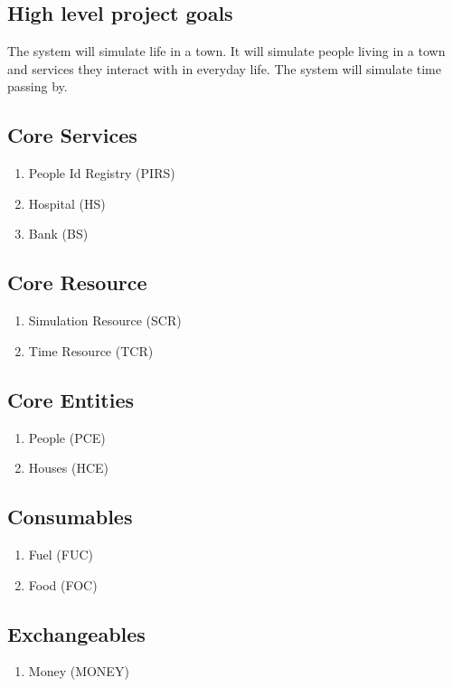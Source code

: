 \subsection{High level project goals} 
The system will simulate life in a town. It will simulate people living in a town and services they interact with in everyday life. 
The system will simulate time passing by.

\subsection{Core Services} 
\begin{enumerate}
\item People Id Registry (PIRS)
\item Hospital (HS)
\item Bank (BS)
\end{enumerate}

\subsection{Core Resource} 
\begin{enumerate}
\item Simulation Resource (SCR)
\item Time Resource (TCR)
\end{enumerate}

\subsection{Core Entities} 
\begin{enumerate}
\item People (PCE)
\item Houses (HCE)
\end{enumerate}

\subsection{Consumables} 
\begin{enumerate}
\item Fuel (FUC)
\item Food (FOC)
\end{enumerate}

\subsection{Exchangeables} 
\begin{enumerate}
\item Money (MONEY)
\end{enumerate}


